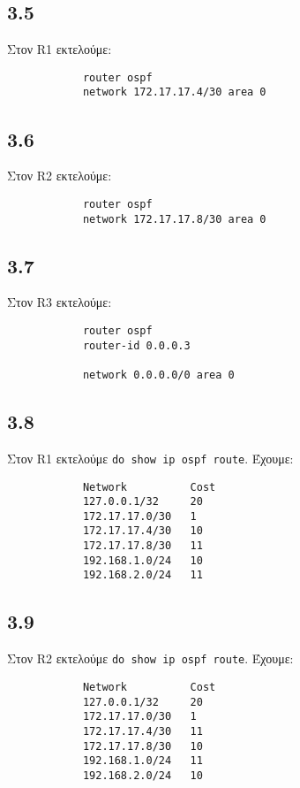 \documentclass[a4paper, 12pt]{article}
\begin{document}
	\subsection*{3.5}
		Στον R1 εκτελούμε:
		
		\begin{verbatim}
			router ospf
			network 172.17.17.4/30 area 0
		\end{verbatim}

	\subsection*{3.6}
		Στον R2 εκτελούμε:
		
		\begin{verbatim}
			router ospf
			network 172.17.17.8/30 area 0
		\end{verbatim}

	\subsection*{3.7}
		Στον R3 εκτελούμε:
		
		\begin{verbatim}
			router ospf
			router-id 0.0.0.3
			
			network 0.0.0.0/0 area 0
		\end{verbatim}

	\subsection*{3.8}
		Στον R1 εκτελούμε \verb|do show ip ospf route|. Έχουμε:
		
		\begin{verbatim}
			Network          Cost
			127.0.0.1/32     20
			172.17.17.0/30   1
			172.17.17.4/30   10
			172.17.17.8/30   11
			192.168.1.0/24   10
			192.168.2.0/24   11
		\end{verbatim}

	\subsection*{3.9}
		Στον R2 εκτελούμε \verb|do show ip ospf route|. Έχουμε:
		
		\begin{verbatim}
			Network          Cost
			127.0.0.1/32     20
			172.17.17.0/30   1
			172.17.17.4/30   11
			172.17.17.8/30   10
			192.168.1.0/24   11
			192.168.2.0/24   10
		\end{verbatim}
\end{document}
